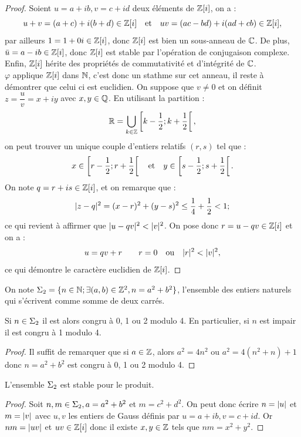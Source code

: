 \begin{proof}
Soient $u = a+ ib, v=c+id$ deux éléments de $\mathbb{Z}[i]$, on a :
\[ u+v = (a+c)+i(b+d) \in \mathbb{Z}[i] \quad \text{et} \quad uv = (ac - bd) + i(ad +cb) \in \mathbb{Z}[i] , \]
par ailleurs $1 = 1 + 0i \in \mathbb{Z}[i]$, donc $\mathbb{Z}[i]$ est bien un sous-anneau de $\mathbb{C}$. 
De plus, $\bar{u} = a-ib \in \mathbb{Z}[i]$, donc $\mathbb{Z}[i]$ est stable par l'opération de conjugaison complexe.
Enfin, $\mathbb{Z}[i]$ hérite des propriétés de commutativité et d'intégrité de $\mathbb{C}$. \\
$\varphi$ applique $\mathbb{Z}[i]$ dans $\mathbb{N}$, c'est donc un stathme sur cet anneau, il reste à démontrer que celui ci est euclidien.
On suppose que $v \neq 0$ et on définit $z = \dfrac{u}{v} = x + iy$ avec $x, y \in \mathbb{Q}$. En utilisant la partition :
\[ \mathbb{R} = \bigcup_{k \in \mathbb{Z}} \left [ k - \dfrac12 ; k + \dfrac12 \right [ , \]
on peut trouver un unique couple d'entiers relatifs $(r,s)$ tel que :
\[ x \in  \left [ r - \dfrac12 ; r + \dfrac12 \right [ \quad \text{et} \quad y \in \left [ s - \dfrac12 ; s + \dfrac12 \right [ . \]
On note $q = r +is \in \mathbb{Z}[i]$, et on remarque que :
\[ \lvert z - q\rvert^2 = (x-r)^2 + (y-s)^2 \leq \dfrac14 + \dfrac12 < 1 ; \]
ce qui revient à affirmer que $\lvert u-qv\rvert^2 < \lvert v\rvert^2$. On pose donc $r = u -qv \in \mathbb{Z}[i]$ et on a :
\[ u = qv + r \qquad r=0 \quad \text{ou} \quad \lvert r\rvert^2 < \lvert v\rvert^2 , \]
ce qui démontre le caractère euclidien de $\mathbb{Z}[i]$.
\end{proof}

\begin{nota}
On note $\Sigma_2 = \{  n \in \mathbb{N} ; \exists (a,b) \in \mathbb{Z}^2, n = a^2+b^2 \}$, l'ensemble des entiers naturels qui s'écrivent comme somme
de deux carrés.
\end{nota}

\begin{lem}
\label{lem:1}
Si $n \in \Sigma_2$ il est alors congru à 0, 1 ou 2 modulo 4. En particulier, si $n$ est impair il est congru à 1 modulo 4.
\end{lem}

\begin{proof}
Il suffit de remarquer que si $a \in \mathbb{Z}$, alors $a^2 = 4n^2$ ou $a^2 = 4(n^2+n)+1$ 
donc $n=a^2+b^2$ est congru à 0, 1 ou 2 modulo 4.
\end{proof}

\begin{lem}
L'ensemble $\Sigma_2$ est stable pour le produit.
\end{lem}

\begin{proof}
Soit $n, m \in \Sigma_2, a = a^2 + b^2$ et $m = c^2 +d^2$. On peut donc écrire $n = \lvert u\rvert$ et $m = \lvert v\rvert$ avec $u, v$ les entiers
de Gauss définis par $u = a+ib, v = c+id$. Or $nm = \lvert uv\rvert$ et $uv \in \mathbb{Z}[i]$ donc il existe $x, y \in \mathbb{Z}$ tels que $nm = x^2 + y^2$.
\end{proof}

